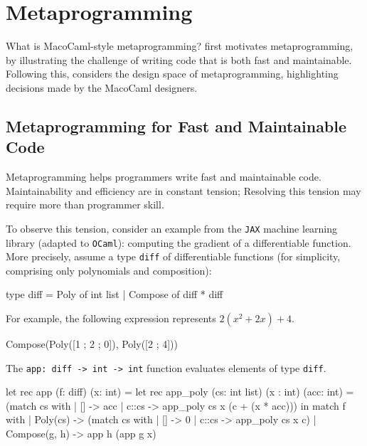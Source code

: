 \section{Metaprogramming}\label{section:metaprogramming-technical}
What is MacoCaml-style metaprogramming?  first motivates metaprogramming, by illustrating the challenge of writing code that is both fast and maintainable. Following this,  considers the design space of metaprogramming, highlighting decisions made by the MacoCaml designers.

\subsection{Metaprogramming for Fast and Maintainable Code}\label{subsection:metaprogramming-motivation}

Metaprogramming helps programmers write fast and maintainable code. Maintainability and efficiency are in constant tension; Resolving this tension may require more than programmer skill. 

To observe this tension, consider an example from the \texttt{JAX} machine learning library (adapted to \texttt{OCaml}): computing the gradient of a differentiable function. More precisely, assume a type \texttt{diff} of differentiable functions (for simplicity, comprising only polynomials and composition):

\begin{ocaml}
type diff = Poly of int list 
          | Compose of diff * diff
\end{ocaml}
For example, the following expression represents $2(x^2 + 2x) + 4$. 
\begin{ocaml}
Compose(Poly([1 ; 2 ; 0]), Poly([2 ; 4]))
\end{ocaml}

The \texttt{app: diff -> int -> int} function evaluates elements of type \texttt{diff}. 

\begin{ocaml}
let rec app (f: diff) (x: int) = 
  let rec app_poly (cs: int list) (x : int) (acc: int) = (match cs with 
    | [] -> acc 
    | c::cs -> app_poly cs x (c + (x * acc)))
  in match f with 
    | Poly(cs)      -> (match cs with 
                        | [] -> 0
                        | c::cs -> app_poly cs x c)
    | Compose(g, h) -> app h (app g x)
\end{ocaml}

